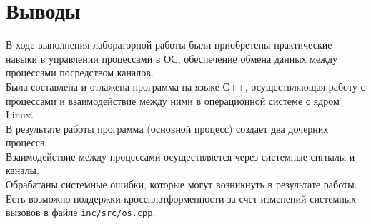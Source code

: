 \section{Выводы}
В ходе выполнения лабораторной работы были приобретены практические навыки в управлении процессами в ОС, обеспечение обмена данных между процессами посредством каналов. \\
Была составлена и отлажена программа на языке С++, осуществляющая работу с процессами и взаимодействие между ними в операционной системе с ядром Linux. \\
В результате работы программа (основной процесс) создает два дочерних процесса. \\
Взаимодействие между процессами осуществляется через системные сигналы и каналы. \\
Обрабатаны системные ошибки, которые могут возникнуть в результате работы. \\
Есть возможно поддержки кроссплатформенности за счет изменений системных вызовов в файле \texttt{inc/src/os.cpp}.
\pagebreak